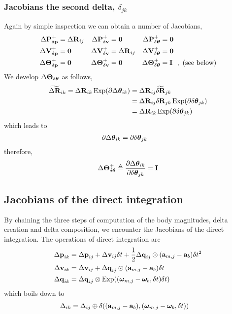 \subsubsection{Jacobians \wrt the second delta, $\delta_{jk}$}
\label{sec:jac_second_delta}

Again by simple inspection we can obtain a number of Jacobians,
%
\begin{align*}
\DP^+_\dpp &= \DR_{ij} & \DP^+_\dv &= \bf0     & \DP^+_\dth &= \bf0 \\
\DV^+_\dpp &= \bf0     & \DV^+_\dv &= \DR_{ij} & \DV^+_\dth &= \bf0 \\
\DTH^+_\dpp &= \bf0    & \DTH^+_\dv &= \bf0    & \DTH^+_\dth &= \bfI %
~~,\textrm{ (see below)}
\end{align*}
%
We develop ${\Delta{\bm \Theta}}_{\delta{{\bm \theta}}}$ as follows,
%
\begin{align*}
\widetilde{{\Delta{\bf R}}}_{ik} = {\Delta{\bf R}}_{ik}\operatorname*{Exp}(\partial{\Delta{{\bm \theta}}}_{ik}) 
&= {\Delta{\bf R}}_{ij}\widetilde{{\delta{\bf R}}}_{jk} \\
&= {\Delta{\bf R}}_{ij}{\delta{\bf R}}_{jk}\operatorname*{Exp}(\partial{\delta{{\bm \theta}}}_{jk}) \\ 
&= {\Delta{\bf R}}_{ik}\operatorname*{Exp}(\partial{\delta{{\bm \theta}}}_{jk}) 
\end{align*}
%
which leads to
%
\begin{align*}
\partial{\Delta{{\bm \theta}}}_{ik} &= \partial{\delta{{\bm \theta}}}_{jk}
\end{align*}
%
therefore,
%
\begin{align}
{\Delta{\bm \Theta}}^+_{\delta{{\bm \theta}}} \triangleq \frac{\partial{\Delta{{\bm \theta}}}_{ik}}{\partial{\delta{{\bm \theta}}}_{jk}} = {\bf I}
\end{align}





\subsection{Jacobians of the direct integration}

By chaining the three steps of computation of the body magnitudes, delta creation and delta composition, we encounter the Jacobians of the direct integration. The operations of direct integration are 
%
\begin{align*}
{\Delta{\bf p}}_{ik} 
&= {\Delta{\bf p}}_{ij} + {\Delta{\bf v}}_{ij}\delta t + \frac12{\Delta{\bf q}}_{ij}\odot({\bf a}_{m,j}-{\bf a}_b)\delta t^2 \\
{\Delta{\bf v}}_{ik} 
&= {\Delta{\bf v}}_{ij} + {\Delta{\bf q}}_{ij}\odot({\bf a}_{m,j}-{\bf a}_b)\delta t \\
{\Delta{\bf q}}_{ik} 
&= {\Delta{\bf q}}_{ij}\otimes\operatorname*{Exp}(({{\bm \omega}}_{m,j}-{{\bm \omega}}_b, \delta t)\delta t) 
\end{align*}
%
which boils down to
%
\begin{align*}
\Delta_{ik} &= \Delta_{ij} \oplus \delta( ({\bf a}_{m,j}-{\bf a}_b), ({{\bm \omega}}_{m,j}-{{\bm \omega}}_b, \delta t) )
\end{align*}
%

